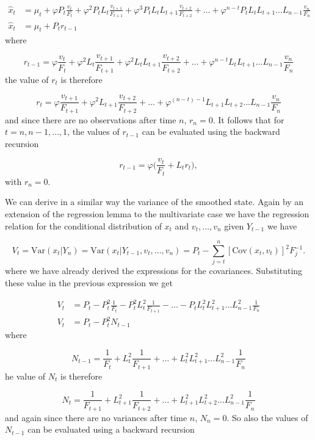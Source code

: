 \documentclass[11pt,a4paper]{article}
\newcommand{\var}{\mathrm{Var}}
\newcommand{\cov}{\mathrm{Cov}}
\begin{document}
\begin{align*}
    \hat{x}_t &= \mu_t + \varphi P_t \frac{v_t}{F_t} + \varphi^2 P_t L_t \frac{v_{t+1}}{F_{t+1}} + \varphi^3 P_t L_t L_{t+1} \frac{v_{t+2}}{F_{t+2}} + \dots + \varphi^{n-t} P_t L_t L_{t+1} \dots L_{n-1} \frac{v_n}{F_n}\\
    \hat{x}_t &= \mu_t + P_t r_{t-1}
\end{align*}
where

\[
    r_{t-1} = \varphi \frac{v_t}{F_t} + \varphi^2 L_t \frac{v_{t+1}}{F_{t+1}} + \varphi^2 L_t L_{t+1} \frac{v_{t+2}}{F_{t+2}} + \dots + \varphi^{n-t} L_t L_{t+1} \dots L_{n-1} \frac{v_n}{F_n}
\]
the value of $r_t$ is therefore

\[
    r_{t} = \varphi \frac{v_{t+1}}{F_{t+1}} + \varphi^2 L_{t+1} \frac{v_{t+2}}{F_{t+2}} + \dots + \varphi^{(n-t)-1}L_{t+1} L_{t+2} \dots L_{n-1} \frac{v_n}{F_n}
\]
and since there are no observations after time $n$, $r_n = 0$.
It follows that for $t = n, n-1, \dots ,1$, the values of $r_{t-1}$ can be evaluated using the backward recursion

\[
    r_{t-1} = \varphi \bigg( \frac{v_t}{F_t} + L_t r_t \bigg), 
\]
with $r_n = 0$.

We can derive in a similar way the variance of the smoothed state. Again by an extension of the regression lemma to the multivariate case we have the regression relation for the conditional distribution of $x_t$ and $v_t, \dots, v_n$ given $Y_{t-1}$ we have

\[
    V_t = \var(x_t | Y_n) = \var(x_t | Y_{t-1}, v_t, \dots, v_n) = P_t - \sum^n_{j=t} [\cov(x_t, v_t)]^2F^{-1}_j.
\]
where we have already derived the expressions for the covariances. Substituting these value in the previous expression we get

\begin{align*}
    V_t &= P_t - P^2_t \frac{1}{F_t} - P^2_t L^2_t \frac{1}{F_{t+1}} - \dots - P_t L^2_t L^2_{t+1} \dots L^2_{n-1} \frac{1}{F_n}\\
    V_t &= P_t - P^2_t N_{t-1}
\end{align*}
where

\[
    N_{t-1} = \frac{1}{F_t} + L^2_t \frac{1}{F_{t+1}} + \dots + L^2_t L^2_{t+1} \dots L^2_{n-1} \frac{1}{F_n}
\]
he value of $N_t$ is therefore

\[
    N_t = \frac{1}{F_{t+1}} + L^2_{t+1} \frac{1}{F_{t+2}} + \dots + L^2_{t+1} L^2_{t+2} \dots L^2_{n-1} \frac{1}{F_n}
\]
and again since there are no variances after time $n$, $N_n = 0$. So also the values of $N_{t-1}$ can be evaluated using a backward recursion
\end{document}
